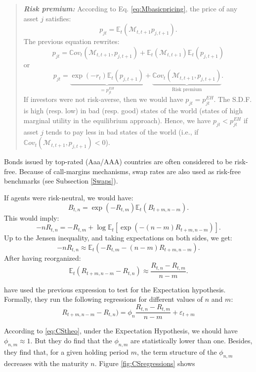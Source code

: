 \documentclass[
  12pt,
]{book}
\theoremstyle{definition}
\theoremstyle{definition}
\theoremstyle{definition}
\theoremstyle{definition}
\theoremstyle{remark}
\begin{document}
\begin{quote}
\textbf{\emph{Risk premium:}} According to Eq. \eqref{eq:Mbasicpricing}, the price of any asset \(j\) satisfies:
\[
p_{jt} = \mathbb{E}_t(\mathcal{M}_{t,t+1} p_{j,t+1}).
\]
The previous equation rewrites:
\[
p_{jt} =  \mathbb{C}ov_t(\mathcal{M}_{t,t+1}, p_{j,t+1}) + \mathbb{E}_t(\mathcal{M}_{t,t+1})\mathbb{E}_t( p_{j,t+1})
\]
or
\begin{equation}
p_{jt} = \underbrace{\exp(-r_t)\mathbb{E}_t( p_{j,t+1})}_{=p^{EH}_{jt}} + \underbrace{\mathbb{C}ov_t(\mathcal{M}_{t,t+1}, p_{j,t+1})}_{\mbox{Risk premium}}.\label{eq:CovRP}
\end{equation}
If investors were not risk-averse, then we would have \(p_{jt} = p^{EH}_{jt}\). The S.D.F. is high (resp. low) in bad (resp. good) states of the world (states of high marginal utility in the equilibrium approach). Hence, we have \(p_{jt}< p^{EH}_{jt}\) if asset \(j\) tends to pay less in bad states of the world (i.e., if \(\mathbb{C}ov_t(\mathcal{M}_{t,t+1}, p_{j,t+1})<0\)).
\end{quote}

Bonds issued by top-rated (Aaa/AAA) countries are often considered to be risk-free. Because of call-margins mechanisms, swap rates are also used as risk-free benchmarks \citep{Duffie_Stein_2015} (see Subsection \ref{Swaps}).

If agents were risk-neutral, we would have:
\[
B_{t,n} = \exp(-R_{t,m})\mathbb{E}_t(B_{t+m,n-m}).
\]
This would imply:
\[
-n R_{t,n} = -R_{t,m} + \log \mathbb{E}_t[\exp(-(n-m) R_{t+m,n-m})].
\]
Up to the Jensen inequality, and taking expectations on both sides, we get:
\[
-n R_{t,n} \approx \mathbb{E}_t(-R_{t,m} -(n-m) R_{t+m,n-m}).
\]
After having reorganized:
\begin{equation}
\mathbb{E}_t(R_{t+m,n-m}-R_{t,n}) \approx \frac{R_{t,n}-R_{t,m}}{n-m}.\label{eq:CStheo}
\end{equation}

\citet{Campbell_Shiller_1991} have used the previous expression to test for the Expectation hypothesis. Formally, they run the following regressions for different values of \(n\) and \(m\):
\[
R_{t+m,n-m}-R_{t,n}) = \phi_n\frac{R_{t,n}-R_{t,m}}{n-m} + \varepsilon_{t+m}
\]

According to \eqref{eq:CStheo}, under the Expectation Hypothesis, we should have \(\phi_{n,m} \approx 1\). But they do find that the \(\phi_{n,m}\) are statistically lower than one. Besides, they find that, for a given holding period \(m\), the term structure of the \(\phi_{n,m}\) decreases with the maturity \(n\). Figure \ref{fig:CSregressions} shows
\end{document}
